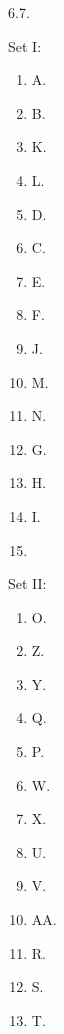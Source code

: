 \begin{refsection}
\begin{practiceproblemsolution}{6.7. \langnameSwahili}
\begin{solutions}[label=Solution 6.7\alph*]
    \item Set I:
    \begin{multicols}{5}
        \begin{enumerate}
            \item A.
            \item B.
            \item K.
            \item L.
            \item D.
            \item C.
            \item E.
            \item F.
            \item J.
            \item M.
            \item N.
            \item G.
            \item H.
            \item I.
            \item[]
        \end{enumerate}
    \end{multicols}
    \item[] Set II:
    \begin{multicols}{5}
        \begin{enumerate}[start = 15, label = \arabic*.]
            \item O.
            \item Z.
            \item Y.
            \item Q.
            \item P.
            \item W.
            \item X.
            \item U.
            \item V.
            \item AA.
            \item R.
            \item S.
            \item T.
        \end{enumerate}
    \end{multicols}
    \item
\begin{enumerate}[label = \arabic*., start = 28]
\begin{multicols}{3}

\end{multicols}
\end{enumerate}
\end{solutions}
\end{practiceproblemsolution}
\end{refsection}
